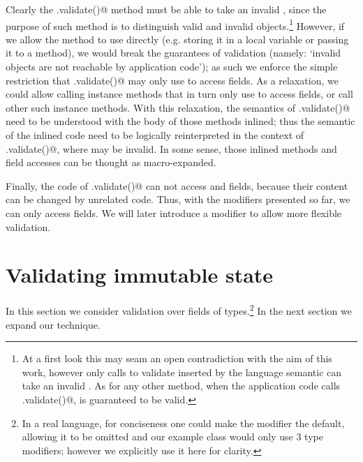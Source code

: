Clearly the \Q@.validate()@ method must be able to take an invalid \Q@this@, since the purpose of such method is to distinguish valid and invalid objects.\footnote{
At a first look this may seam an open contradiction
with the aim of this work, however only calls to validate inserted by the language semantic can take an invalid \Q@this@. As for any other method, when the application code calls \Q@.validate()@,
\Q@this@ is guaranteed to be valid.
} However, if we allow the method to use \Q@this@ directly (e.g. storing it in a local variable or passing it to a method), we would break the guarantees of validation (namely: `invalid objects are not reachable by application code'); as such we enforce the simple restriction that \Q@.validate()@ may only use \Q@this@ to access fields.
As a relaxation, we could allow calling instance methods that in turn only use \Q@this@ to access fields, or call other such instance methods. With this relaxation, the semantics of \Q@.validate()@ need to be understood with the body of those methods inlined; thus the semantic of the inlined code need to be logically reinterpreted in the context of \Q@.validate()@, where \Q@this@ may be invalid.
In some sense, those inlined methods and field accesses can be thought as macro-expanded.


Finally,
the code of \Q@.validate()@ can not access  \Q@mut@ and \Q@read@ fields, because their content can be changed by unrelated code.
Thus, with the modifiers presented so far, we can only access \Q@imm@ fields.
We will later introduce a \Q@capsule@ modifier to allow more flexible validation.



%

\section{Validating immutable state}
\label{s:immState}
In this section we consider validation over fields of \Q@imm@ types.\footnote{
In a real language, for conciseness one could make the \Q@imm@ modifier the default, allowing it to be omitted and our \Q@Person@ example class would only use 3 type modifiers; however we explicitly use it here for clarity.
}
In the next section we expand our technique.

